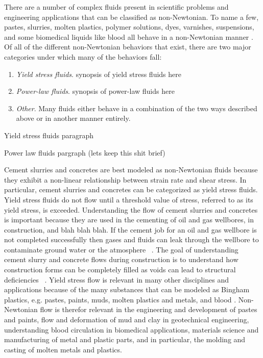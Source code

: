 \documentclass{article}
\begin{document}
There are a number of complex fluids present in scientific problems and engineering applications that can be classified as non-Newtonian.
To name a few, pastes, slurries, molten plastics, polymer solutions, dyes, varnishes, suspensions, and some biomedical liquids like blood all behave in a non-Newtonian manner \cite{bohme1987non}.
Of all of the different non-Newtonian behaviors that exist, there are two major categories under which many of the behaviors fall:
\begin{enumerate}
	\item \emph{Yield stress fluids}. {\color{red} synopsis of yield stress fluids here}
	\item \emph{Power-law fluids}. {\color{red} synopsis of power-law fluids here}
	\item \emph{Other}. Many fluids either behave in a combination of the two ways described above or in another manner entirely.
\end{enumerate}

Yield stress fluids paragraph

Power law fluids pargraph (lets keep this shit brief)

Cement slurries and concretes are best modeled as non-Newtonian fluids because they exhibit a non-linear relationship between strain rate and shear stress.
In particular, cement slurries and concretes can be categorized as yield stress fluids. 
Yield stress fluids do not flow until a threshold value of stress, referred to as its yield stress, is exceeded.
Understanding the flow of cement slurries and concretes is important because they are used in the cementing of oil and gas wellbores, in construction, and blah blah blah.
If the cement job for an oil and gas wellbore is not completed successfully then gases and fluids can leak through the wellbore to contaminate ground water or the atmosphere ~\cite{grasinger2015simulation}.
The goal of understanding cement slurry and concrete flows during construction is to understand how construction forms can be completely filled as voids can lead to structural deficiencies ~\cite{RARR}.
Yield stress flow is relevant in many other disciplines and applications because of the many substances that can be modeled as Bingham plastics, e.g. pastes, paints, muds, molten plastics and metals, and blood \cite{wang2011lattice}. %
Non-Newtonian flow is therefor relevant in the engineering and development of pastes and paints, flow and deformation of mud and clay in geotechnical engineering, understanding blood circulation in biomedical applications, materials science and manufacturing of metal and plastic parts, and in particular, the molding and casting of molten metals and plastics.
\end{document}
